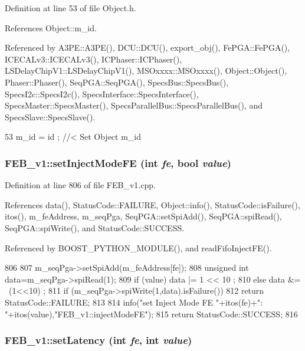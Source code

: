 Definition at line 53 of file Object.h.

References Object::m\_\-id.

Referenced by A3PE::A3PE(), DCU::DCU(), export\_\-obj(), FePGA::FePGA(), ICECALv3::ICECALv3(), ICPhaser::ICPhaser(), LSDelayChipV1::LSDelayChipV1(), MSOxxxx::MSOxxxx(), Object::Object(), Phaser::Phaser(), SeqPGA::SeqPGA(), SpecsBus::SpecsBus(), SpecsI2c::SpecsI2c(), SpecsInterface::SpecsInterface(), SpecsMaster::SpecsMaster(), SpecsParallelBus::SpecsParallelBus(), and SpecsSlave::SpecsSlave().


\begin{DoxyCode}
53 { m_id    = id    ; } //< Set Object m_id
\end{DoxyCode}
\hypertarget{classFEB__v1_aea3983d847c7b8053485ddd16af65680}{
\subsubsection[{setInjectModeFE}]{ FEB\_\-v1::setInjectModeFE (int {\em fe}, \/  bool {\em value})}}
\label{classFEB__v1_aea3983d847c7b8053485ddd16af65680}


Definition at line 806 of file FEB\_\-v1.cpp.

References data(), StatusCode::FAILURE, Object::info(), StatusCode::isFailure(), itos(), m\_\-feAddress, m\_\-seqPga, SeqPGA::setSpiAdd(), SeqPGA::spiRead(), SeqPGA::spiWrite(), and StatusCode::SUCCESS.

Referenced by BOOST\_\-PYTHON\_\-MODULE(), and readFifoInjectFE().


\begin{DoxyCode}
806                                                       {
807   m_seqPga->setSpiAdd(m_feAddress[fe]);
808   unsigned int data=m_seqPga->spiRead(1);
809   if (value)  data |= 1 << 10 ;
810   else        data &= ~(1<<10) ;
811   if (m_seqPga->spiWrite(1,data).isFailure()){
812     return StatusCode::FAILURE;
813   }
814   info("set Inject Mode FE "+itos(fe)+": "+itos(value),"FEB_v1::injectModeFE");
815   return StatusCode::SUCCESS;
816 }
\end{DoxyCode}
\hypertarget{classFEB__v1_ae3252ed2737b5c93395da201b427b871}{
\subsubsection[{setLatency}]{ FEB\_\-v1::setLatency (int {\em fe}, \/  int {\em value})}}
\label{classFEB__v1_ae3252ed2737b5c93395da201b427b871}


